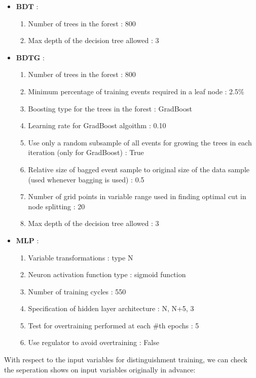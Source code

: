 			\begin{itemize}

				\item $\textbf{BDT}$ :
				\begin{enumerate}
					\item Number of trees in the forest : 800
					\item Max depth of the decision tree allowed : 3
				\end{enumerate}
				\item $\textbf{BDTG}$ :
				\begin{enumerate}
					\item Number of trees in the forest : 800
					\item Minimum percentage of training events required in a leaf node : 2.5\%
					\item Boosting type for the trees in the forest : GradBoost
					\item Learning rate for GradBoost algoithm : 0.10
					\item Use only a random subsample of all events for growing the trees in each iteration (only for GradBoost) : True
					\item Relative size of bagged event sample to original size of the data sample (used whenever bagging is used) : 0.5
					\item Number of grid points in variable range used in finding optimal cut in node splitting : 20
					\item Max depth of the decision tree allowed : 3
				\end{enumerate}
				\item $\textbf{MLP}$ :
				\begin{enumerate}
					\item Variable transformations : type N
					\item Neuron activation function type : sigmoid function
					\item Number of training cycles : 550
					\item Specification of hidden layer architecture : N, N+5, 3
					\item Test for overtraining performed at each $\#$th epochs : 5
					\item Use regulator to avoid overtraining : False
				\end{enumerate}
			\end{itemize}

			With respect to the input variables for distinguishment training, we can check the seperation shows on input variables originally in advance:

